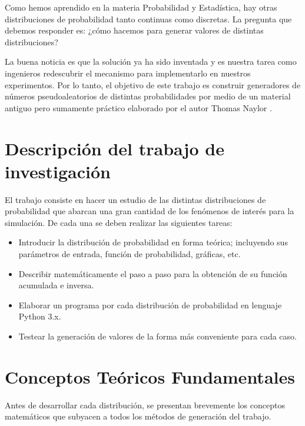 \documentclass[a4paper, 11pt]{article}
\begin{document}
Como hemos aprendido en la materia Probabilidad y Estadística, hay otras distribuciones
de probabilidad tanto continuas como discretas. La pregunta que debemos responder es:
¿cómo hacemos para generar valores de distintas distribuciones?

La buena noticia es que la solución ya ha sido inventada y es nuestra tarea como ingenieros
redescubrir el mecanismo para implementarlo en nuestros experimentos. Por lo tanto, el
objetivo de este trabajo es construir generadores de números pseudoaleatorios de distintas
probabilidades por medio de un material antiguo pero sumamente práctico elaborado por el
autor Thomas Naylor \cite{naylor1982}.

\section{Descripción del trabajo de investigación}

El trabajo consiste en hacer un estudio de las distintas distribuciones de probabilidad
que abarcan una gran cantidad de los fenómenos de interés para la simulación. De cada una
se deben realizar las siguientes tareas:

\begin{itemize}
    \item Introducir la distribución de probabilidad en forma teórica; incluyendo sus
          parámetros de entrada, función de probabilidad, gráficas, etc.
    \item Describir matemáticamente el paso a paso para la obtención de su función
          acumulada e inversa.
    \item Elaborar un programa por cada distribución de probabilidad en lenguaje Python 3.x.
    \item Testear la generación de valores de la forma más conveniente para cada caso.
\end{itemize}

\newpage
\section{Conceptos Teóricos Fundamentales}

Antes de desarrollar cada distribución, se presentan brevemente los conceptos matemáticos
que subyacen a todos los métodos de generación del trabajo.
\end{document}
